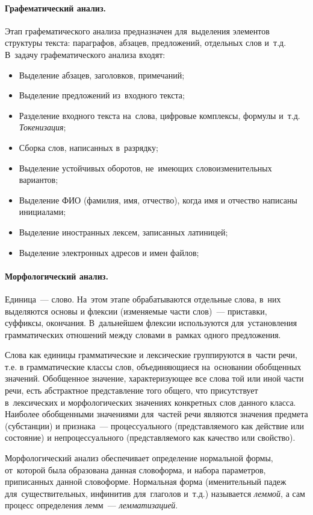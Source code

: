 \documentclass[12pt]{article}
\theoremstyle{definition}
\theoremstyle{remark}
\numberwithin{equation}{section}
\begin{document}
\paragraph{Графематический анализ.} Этап графематического
анализа предназначен для~выделения элементов структуры текста:
параграфов, абзацев, предложений, отдельных слов и~т.д.
В~задачу графематического анализа входят:
\begin{itemize}
    \item Выделение абзацев, заголовков, примечаний;
    \item Выделение предложений из~входного текста;
    \item Разделение входного текста на~слова, цифровые комплексы,
    формулы и~т.д. {\sl Токенизация};
    \item Сборка слов, написанных в~разрядку;
    \item Выделение устойчивых оборотов, не~имеющих словоизменительных
    вариантов;
    \item Выделение ФИО (фамилия, имя, отчество), когда имя и отчество
    написаны инициалами;
    \item Выделение иностранных лексем, записанных латиницей;
    \item Выделение электронных адресов и имен файлов;
\end{itemize}

\paragraph{Морфологический анализ.} Единица~--- слово. На~этом этапе
обрабатываются отдельные слова, в~них выделяются основы и флексии
(изменяемые части слов)~--- приставки, суффиксы, окончания.
В~дальнейшем флексии используются для~установления грамматических
отношений между словами в~рамках одного предложения.

Слова как единицы грамматические и лексические группируются
в~части речи, т.е. в грамматические классы слов, объединяющиеся
на~основании обобщенных значений. Обобщенное значение, характеризующее
все слова той или иной части речи, есть абстрактное представление
того общего, что присутствует в~лексических и морфологических значениях
конкретных слов данного класса. Наиболее обобщенными значениями
для~частей речи являются значения предмета (субстанции) и признака~---
процессуального (представляемого как действие или состояние) и
непроцессуального (представляемого как качество или свойство).

Морфологический анализ обеспечивает определение нормальной
формы, от~которой была образована данная словоформа, и набора
параметров, приписанных данной словоформе. Нормальная форма
(именительный падеж для~существительных, инфинитив для~глаголов
и~т.д.) называется {\sl леммой}, а сам процесс определения лемм~---
{\sl лемматизацией}.
\end{document}
